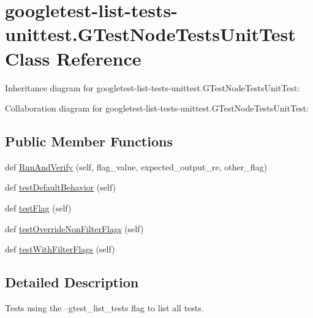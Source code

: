 \hypertarget{classgoogletest-list-tests-unittest_1_1GTestListTestsUnitTest}{}\section{googletest-\/list-\/tests-\/unittest.G\+Test\+Node\+Tests\+Unit\+Test Class Reference}
\label{classgoogletest-list-tests-unittest_1_1GTestListTestsUnitTest}


Inheritance diagram for googletest-\/list-\/tests-\/unittest.G\+Test\+Node\+Tests\+Unit\+Test\+:


Collaboration diagram for googletest-\/list-\/tests-\/unittest.G\+Test\+Node\+Tests\+Unit\+Test\+:
\subsection*{Public Member Functions}
\begin{DoxyCompactItemize}
\item 
def \hyperlink{classgoogletest-list-tests-unittest_1_1GTestListTestsUnitTest_a6630e10404717e8edd3df1439fb0d81c}{Run\+And\+Verify} (self, flag\+\_\+value, expected\+\_\+output\+\_\+re, other\+\_\+flag)
\item 
def \hyperlink{classgoogletest-list-tests-unittest_1_1GTestListTestsUnitTest_aacba8c9eaef1b649ba40ede17218d0f1}{test\+Default\+Behavior} (self)
\item 
def \hyperlink{classgoogletest-list-tests-unittest_1_1GTestListTestsUnitTest_a8f5b423963d862456348a8903ccdfade}{test\+Flag} (self)
\item 
def \hyperlink{classgoogletest-list-tests-unittest_1_1GTestListTestsUnitTest_a961396c3c2b8d22f6491beb5348594aa}{test\+Override\+Non\+Filter\+Flags} (self)
\item 
def \hyperlink{classgoogletest-list-tests-unittest_1_1GTestListTestsUnitTest_adb60d2295fee8ed4af2a5ee1a32e5778}{test\+With\+Filter\+Flags} (self)
\end{DoxyCompactItemize}


\subsection{Detailed Description}
\begin{DoxyVerb}Tests using the --gtest_list_tests flag to list all tests.\end{DoxyVerb}
 

